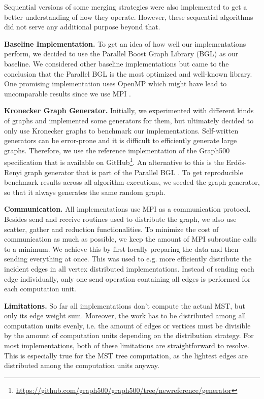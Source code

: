 \documentclass[letterpaper]{article}
\newcommand{\mypar}[1]{{\bf #1.}}
\begin{document}
Sequential versions of some merging strategies were also implemented to get a better understanding of how they operate.
However, these sequential algorithms did not serve any additional purpose beyond that.

\mypar{Baseline Implementation}
To get an idea of how well our implementations perform, we decided to use the Parallel Boost Graph Library (BGL)
\cite{bgl} as our baseline. We considered other baseline implementations but came to the conclusion that the Parallel
BGL is the most optimized and well-known library. One promising implementation uses OpenMP which might have lead to
uncomparable results since we use MPI \cite{15418}.

\mypar{Kronecker Graph Generator}
\label{par:kronecker_graph_generator}
Initially, we experimented with different kinds of graphs and implemented some generators for them, but ultimately
decided to only use Kronecker graphs to benchmark our implementations. Self-written generators can be error-prone and it
is difficult to efficiently generate large graphs. Therefore, we use the reference implementation of the Graph500
specification that is available on
GitHub\footnote{\url{https://github.com/graph500/graph500/tree/newreference/generator}}. An alternative to this is the
Erdös-Renyi graph generator that is part of the Parallel BGL \cite{bgl}. To get reproducible benchmark results across
all algorithm executions, we seeded the graph generator, so that it always generates the same random graph.

\mypar{Communication}
All implementations use MPI as a communication protocol. Besides send and receive routines used to distribute the graph,
we also use scatter, gather and reduction functionalities. To minimize the cost of communication as much as possible, we
keep the amount of MPI subroutine calls to a minimum. We achieve this by first locally preparing the data and then
sending everything at once. This was used to e.g. more efficiently distribute the incident edges in all vertex
distributed implementations. Instead of sending each edge individually, only one send operation containing all edges is
performed for each computation unit.

\mypar{Limitations}
\label{par:limitation}
So far all implementations don't compute the actual MST, but only its edge weight sum. Moreover, the work has to be
distributed among all computation units evenly, i.e. the amount of edges or vertices must be divisible by the amount of
computation units depending on the distribution strategy. For most implementations, both of these limitations are
straightforward to resolve. This is especially true for the MST tree computation, as the lightest edges are distributed
among the computation units anyway.
\end{document}
